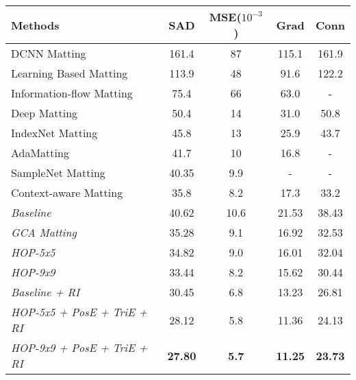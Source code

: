 \begin{table}[t]
	\setlength{\tabcolsep}{8pt}
	\centering
	\begin{tabular}{l|cccc}  
		\toprule
		Methods & SAD & MSE($10^{-3}$) & Grad &Conn\\
		\midrule
		DCNN Matting\cite{cho2019deep}& 161.4& 87 &115.1& 161.9 \\
		Learning Based Matting \cite{zheng2009learning}&113.9& 48 &91.6 &122.2\\ 
		Information-flow Matting\cite{aksoy2017designing} & 75.4& 66& 63.0&-\\
		Deep Matting\cite{xu2017deep} &50.4& 14& 31.0& 50.8\\
		IndexNet Matting\cite{lu2019indices} &45.8&	13&	25.9&	43.7\\	
		AdaMatting\cite{cai2019disentangled}&41.7&10  &16.8 &-\\
		SampleNet Matting\cite{samplenet} &40.35&	9.9&	-&	-\\	
		Context-aware Matting\cite{hou2019context}& 35.8 & 8.2& 17.3& 33.2\\
		\midrule
		\textit{Baseline}  & 40.62 & 10.6 & 21.53 & 38.43\\
		\textit{GCA Matting} &35.28&	9.1&	16.92&	32.53\\
		\textit{HOP-5x5}& 34.82& 9.0 & 16.01& 32.04\\
		
		\textit{HOP-9x9}& {33.44}&{8.2}& {15.62}&{30.44} \\
		\textit{Baseline + RI}& 30.45& 6.8 & 13.23& 26.81\\
		\textit{HOP-5x5 + PosE + TriE + RI} & {28.12}& {5.8} & {11.36}& {24.13}\\
		\textit{HOP-9x9 + PosE + TriE + RI}& \textbf{27.80}& \textbf{5.7} & \textbf{11.25}& \textbf{23.73}\\
		\bottomrule
	\end{tabular}
	\label{tab5:adobe}
	\end{table}
	

